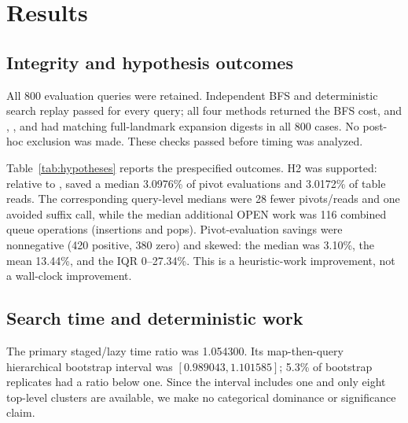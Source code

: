 \section{Results}
\label{sec:results}

\subsection{Integrity and hypothesis outcomes}

All 800 evaluation queries were retained.  Independent BFS and deterministic
search replay passed for every query; all four methods returned the BFS cost,
and \EagerFull{}, \LazyFull{}, and \Staged{} had matching full-landmark
expansion digests in all 800 cases.  No post-hoc exclusion was made.  These
checks passed before timing was analyzed.

\begin{table}[t]
\centering
\small
\caption{Outcomes under the prespecified analysis.  H3 is descriptive;
its bootstrap fraction and correlation are not significance or causal tests.}
\label{tab:hypotheses}
\resizebox{\textwidth}{!}{}
\end{table}

Table~\ref{tab:hypotheses} reports the prespecified outcomes.  H2 was supported:
relative to \LazyFull{}, \Staged{} saved a median 3.0976\% of pivot
evaluations and 3.0172\% of table reads.  The corresponding query-level
medians were 28 fewer pivots/reads and one avoided suffix call, while the
median additional OPEN work was 116 combined queue operations (insertions and
pops).  Pivot-evaluation savings were nonnegative (420 positive, 380 zero) and
skewed: the median was 3.10\%, the mean 13.44\%, and the IQR 0--27.34\%.  This is a
heuristic-work improvement, not a wall-clock improvement.

\subsection{Search time and deterministic work}

The primary staged/lazy time ratio was 1.054300.  Its map-then-query
hierarchical bootstrap interval was $[0.989043,1.101585]$; 5.3\% of bootstrap
replicates had a ratio below one.  Since the interval includes one and only
eight top-level clusters are available, we make no categorical dominance or
significance claim.

